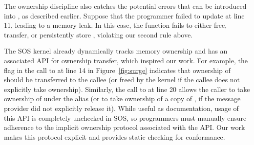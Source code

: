 The ownership discipline also catches the potential errors that can be
introduced into , as described earlier.  
%
%
%
Suppose that the programmer failed to update 
at line 11, leading to a memory leak.  In this case, the
 function fails to either free, transfer, or
persistently store , violating our second rule above.
 



The SOS kernel already dynamically tracks memory
ownership and has an associated API for ownership transfer, which
inspired our work.  For example, the  flag in
the call to  at
line 14 in Figure~\ref{fig:surge} indicates that ownership of
 should be transferred to the callee (or freed by the kernel
if the callee does not explicitly take ownership).  Similarly, the
call to  at line 20 allows the caller to
take ownership of  under the alias  (or to
take ownership of a copy of , if the message provider did
not explicitly release it).  While useful as documentation, usage of
this API is completely unchecked in SOS, so programmers must manually
ensure adherence to the implicit ownership protocol associated with
the API.  Our work makes this protocol explicit and provides static
checking for conformance.

